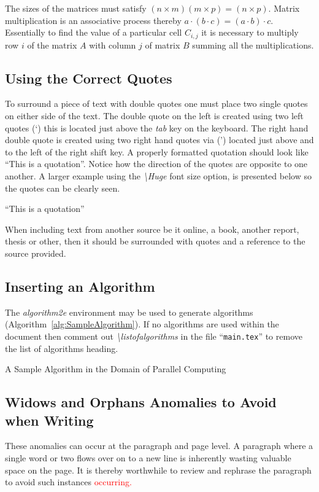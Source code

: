 The sizes of the matrices must satisfy $(n \times m)(m \times p) = (n \times p)$. Matrix multiplication is an associative process thereby $a\cdot(b \cdot c) = (a \cdot b) \cdot c$. Essentially to find the value of a particular cell $C_{i,j}$ it is necessary to multiply row $i$ of the matrix $A$ with column $j$ of matrix $B$ summing all the multiplications.

\subsection{Using the Correct Quotes}
To surround a piece of text with double quotes one must place two single quotes on either side of the text. The double quote on the left is created using two left quotes (\lq) this is located just above the \emph{tab} key on the keyboard. The right hand double quote is created using two right hand quotes via (\rq) located just above and to the left of the right shift key. A properly formatted quotation should look like ``This is a quotation''. Notice how the direction of the quotes are opposite to one another. A larger example using the \emph{\textbackslash Huge} font size option, is presented below so the quotes can be clearly seen.
\begin{center}
\Huge{``This is a quotation''}
\end{center}
When including text from another source be it online, a book, another report, thesis or other, then it should be surrounded with quotes and a reference to the source provided. 

\subsection{Inserting an Algorithm}
The \emph{algorithm2e} environment \cite{online:Fiorio2016algorithm2e} may be used to generate algorithms (Algorithm~\ref{alg:SampleAlgorithm}). If no algorithms are used within the document then comment out \emph{\textbackslash listofalgorithms } in the file ``{\tt main.tex}'' to remove the list of algorithms heading.

\begin{algorithm}
{}
\caption{A Sample Algorithm in the Domain of Parallel Computing} \label{alg:SampleAlgorithm}
\end{algorithm}

\subsection{Widows and Orphans Anomalies to Avoid when Writing}
These anomalies can occur at the paragraph and page level. A paragraph where a single word or two flows over on to a new line is inherently wasting valuable space on the page. It is thereby worthwhile to review and rephrase the paragraph to avoid such instances \textcolor{red}{occurring.}  

